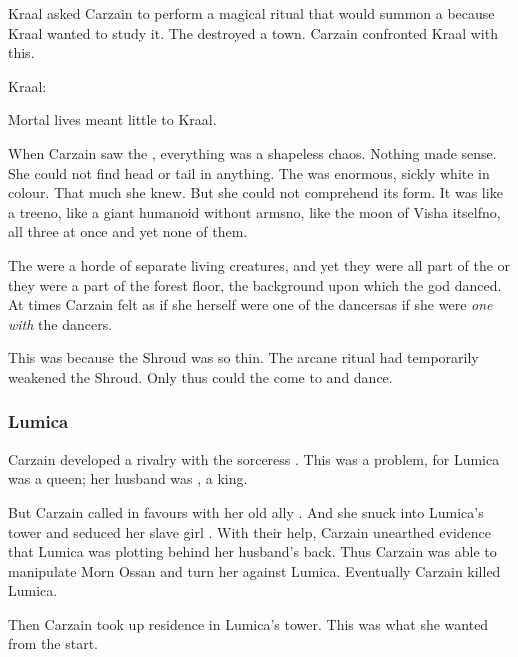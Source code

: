 Kraal asked Carzain to perform a magical ritual that would summon a \moongod because Kraal wanted to study it.
The \moongod destroyed a town.
Carzain confronted Kraal with this. 

\begin{prose}
  Kraal: 
\end{prose}

Mortal lives meant little to Kraal.

When Carzain saw the \moongod, everything was a shapeless chaos.
Nothing made sense.
She could not find head or tail in anything. 
The \moongod was enormous, sickly white in colour. 
That much she knew.
But she could not comprehend its form. 
It was like a tree\dash no, like a giant humanoid without arms\dash no, like the moon of Visha itself\dash no, all three at once and yet none of them. 

The \glithids were a horde of separate living creatures, and yet they were all part of the \moongod\dash or they were a part of the forest floor, the background upon which the god danced. 
At times Carzain felt as if she herself were one of the dancers\dash as if she were \emph{one with} the dancers. 

This was because the Shroud was so thin.
The arcane ritual had temporarily weakened the Shroud. 
Only thus could the \moongod come to \Miith and dance.






\subsubsection{Lumica}
Carzain developed a rivalry with the sorceress .
This was a problem, for Lumica was a queen; her husband was , a king. 

But Carzain called in favours with her old ally .
And she snuck into Lumica's tower and seduced her slave girl .
With their help, Carzain unearthed evidence that Lumica was plotting behind her husband's back.
Thus Carzain was able to manipulate Morn Ossan and turn her against Lumica.
Eventually Carzain killed Lumica. 

Then Carzain took up residence in Lumica's tower.
This was what she wanted from the start. 






